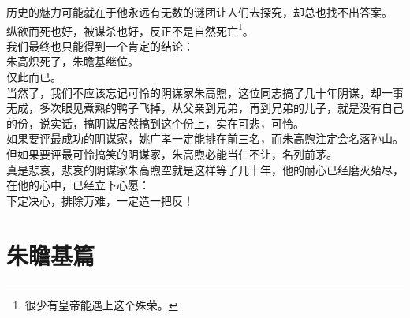 \begin{multicols}{\theparacolNo}
历史的魅力可能就在于他永远有无数的谜团让人们去探究，却总也找不出答案。\\

纵欲而死也好，被谋杀也好，反正不是自然死亡\footnote{很少有皇帝能遇上这个殊荣。}。\\

我们最终也只能得到一个肯定的结论：\\

朱高炽死了，朱瞻基继位。\\

仅此而已。\\

当然了，我们不应该忘记可怜的阴谋家朱高煦，这位同志搞了几十年阴谋，却一事无成，多次眼见煮熟的鸭子飞掉，从父亲到兄弟，再到兄弟的儿子，就是没有自己的份，说实话，搞阴谋居然搞到这个份上，实在可悲，可怜。\\

如果要评最成功的阴谋家，姚广孝一定能排在前三名，而朱高煦注定会名落孙山。\\

但如果要评最可怜搞笑的阴谋家，朱高煦必能当仁不让，名列前茅。\\

真是悲哀，悲哀的阴谋家朱高煦空就是这样等了几十年，他的耐心已经磨灭殆尽，在他的心中，已经立下心愿：\\

下定决心，排除万难，一定造一把反！\\
\ifnum{}
	\end{multicols}
\fi
\newpage
\chapter*{朱瞻基篇}
